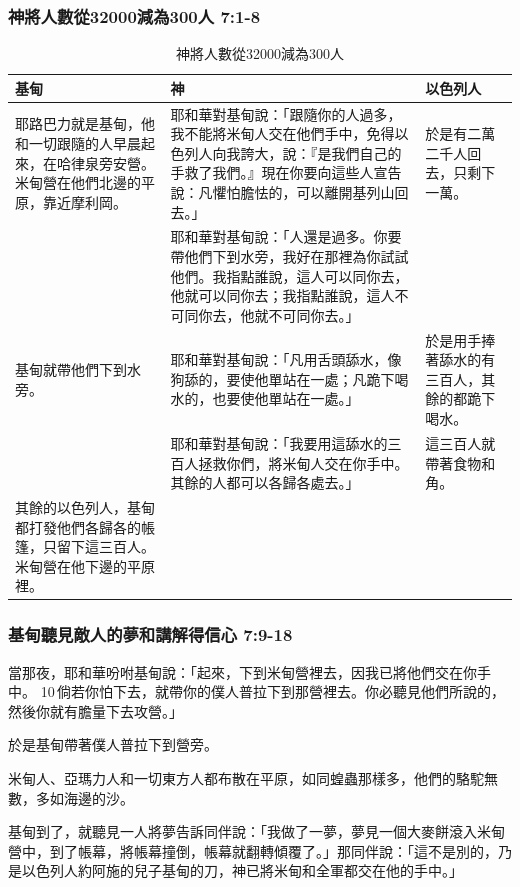 \subsubsection{神將人數從32000減為300人 7:1-8}
\begin{table}[H]
\centering
\begin{tabular}{p{}|p{}|p{3.9cm}}\hline\hline
基甸&神&以色列人\\\hline
耶路巴力就是基甸，他和一切跟隨的人早晨起來，在哈律泉旁安營。米甸營在他們北邊的平原，靠近摩利岡。
&耶和華對基甸說：「跟隨你的人過多，我不能將米甸人交在他們手中，免得以色列人向我誇大，說：『是我們自己的手救了我們。』現在你要向這些人宣告說：凡懼怕膽怯的，可以離開基列山回去。」&於是有二萬二千人回去，只剩下一萬。\\\hline
&耶和華對基甸說：「人還是過多。你要帶他們下到水旁，我好在那裡為你試試他們。我指點誰說，這人可以同你去，他就可以同你去；我指點誰說，這人不可同你去，他就不可同你去。」&\\\hline
基甸就帶他們下到水旁。&耶和華對基甸說：「凡用舌頭舔水，像狗舔的，要使他單站在一處；凡跪下喝水的，也要使他單站在一處。」&於是用手捧著舔水的有三百人，其餘的都跪下喝水。\\\hline
&耶和華對基甸說：「我要用這舔水的三百人拯救你們，將米甸人交在你手中。其餘的人都可以各歸各處去。」&這三百人就帶著食物和角。\\\hline
其餘的以色列人，基甸都打發他們各歸各的帳篷，只留下這三百人。米甸營在他下邊的平原裡。&&\\\hline
 \end{tabular}
\caption{神將人數從32000減為300人}
\end{table}







\subsubsection{基甸聽見敵人的夢和講解得信心 7:9-18}  
當那夜，耶和華吩咐基甸說：「起來，下到米甸營裡去，因我已將他們交在你手中。 10 倘若你怕下去，就帶你的僕人普拉下到那營裡去。你必聽見他們所說的，然後你就有膽量下去攻營。」

於是基甸帶著僕人普拉下到營旁。

米甸人、亞瑪力人和一切東方人都布散在平原，如同蝗蟲那樣多，他們的駱駝無數，多如海邊的沙。

基甸到了，就聽見一人將夢告訴同伴說：「我做了一夢，夢見一個大麥餅滾入米甸營中，到了帳幕，將帳幕撞倒，帳幕就翻轉傾覆了。」那同伴說：「這不是別的，乃是以色列人約阿施的兒子基甸的刀，神已將米甸和全軍都交在他的手中。」

